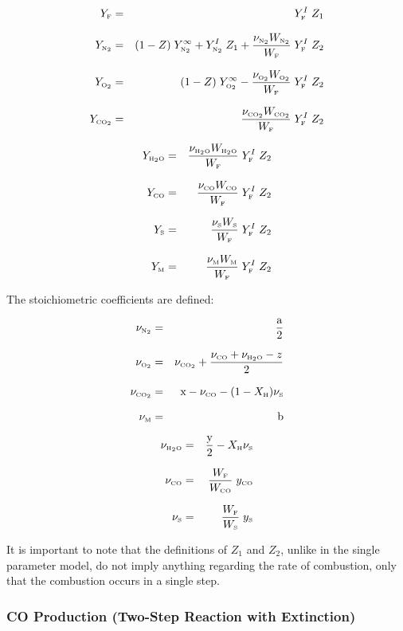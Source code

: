 \documentclass[11pt]{book}
\begin{document}
\parbox{2.5in}{
\begin{eqnarray*}  Y_{\tiny \hbox{F}}     &=& Y_{\tiny \hbox{F}}^I \; Z_1  \\*[.1in]
                  Y_{\tiny \hbox{N}_2}  &=& (1 - Z) \; Y_{\tiny \hbox{N}_2}^\infty  + Y_{\tiny \hbox{N}_2}^I \; Z_1 + \frac{\nu_{\tiny \hbox{N}_2} W_{\tiny \hbox{N}_2}}{W_{\tiny \hbox{F}}} \; Y_{\tiny \hbox{F}}^I \; Z_2  \\*[.1in]
                  Y_{\tiny \hbox{O}_2}  &=& (1 - Z) \; Y_{\tiny \hbox{O}_2}^\infty - \frac{\nu_{\tiny \hbox{O}_2} W_{\tiny \hbox{O}_2}}{W_{\tiny \hbox{F}}} \; Y_{\tiny \hbox{F}}^I \; Z_2 \\*[.1in]
                  Y_{\tiny \hbox{CO}_2} &=& \frac{\nu_{\tiny \hbox{CO}_2} W_{\tiny \hbox{CO}_2}}{W_{\tiny \hbox{F}}} \; Y_{\tiny \hbox{F}}^I \; Z_2 \end{eqnarray*} }
\hfill \parbox{3.5in}{\begin{eqnarray}
                  Y_{\tiny \hbox{H}_2\hbox{O}} &=& \frac{\nu_{\tiny \hbox{H}_2\hbox{O}} W_{\tiny \hbox{H}_2\hbox{O}}}{W_{\tiny \hbox{F}}} \; Y_{\tiny \hbox{F}}^I \; Z_2 \\*[.1in]
                  Y_{\tiny \hbox{CO}}    &=& \frac{\nu_{\tiny \hbox{CO}} W_{\tiny \hbox{CO}}}{W_{\tiny \hbox{F}}} \; Y_{\tiny \hbox{F}}^I \; Z_2  \\*[.1in]
                  Y_{\tiny \hbox{S}}    &=& \frac{\nu_{\tiny \hbox{S}} W_{\tiny \hbox{S}}}{W_{\tiny \hbox{F}}} \; Y_{\tiny \hbox{F}}^I \; Z_2 \\*[.1in]
                  Y_{\tiny \hbox{M}}     &=& \frac{\nu_{\tiny \hbox{M}} W_{\tiny \hbox{M}}}{W_{\tiny \hbox{F}}} \; Y_{\tiny \hbox{F}}^I \; Z_2
\end{eqnarray} }

\noindent
The stoichiometric coefficients are defined:

\parbox{2.5in}{
\begin{eqnarray*}  \nu_{\tiny \hbox{N}_2}  &=& \frac{\hbox{a}}{2}\\*[.1in]
                  \nu_{\tiny \hbox{O}_2}  &=& \nu_{\tiny \hbox{CO}_2} + \frac{\nu_{\tiny \hbox{CO}}+\nu_{\tiny \hbox{H}_2\hbox{O}}-z}{2}\\*[.1in]
                  \nu_{\tiny \hbox{CO}_2} &=& \hbox{x} - \nu_{\tiny \hbox{CO}} - (1-X_{\tiny \hbox{H}}) \nu_{\tiny \hbox{S}}  \\*[.1in]
                  \nu_{\tiny \hbox{M}}     &=& \hbox{b}  \end{eqnarray*} }
\hfill \parbox{3.5in}{\begin{eqnarray}
                  \nu_{\tiny \hbox{H}_2\hbox{O}} &=& \frac{\hbox{y}}{2}- X_{\tiny \hbox{H}} \nu_{\tiny \hbox{S}}\\*[.1in]
                  \nu_{\tiny \hbox{CO}}    &=& \frac{W_{\tiny \hbox{F}}}{W_{\tiny \hbox{CO}}} \; y_{\tiny \hbox{CO}} \\*[.1in]
                  \nu_{\tiny \hbox{S}}    &=& \frac{W_{\tiny \hbox{F}}}{W_{\tiny \hbox{S}}} \; y_{\tiny \hbox{S}}
\end{eqnarray} }
It is important to note that the definitions of $Z_1$ and $Z_2$, unlike in the single parameter model,
do not imply anything regarding the rate of combustion, only that the combustion occurs in a single step.


\subsubsection{CO Production (Two-Step Reaction with Extinction)}
\end{document}
